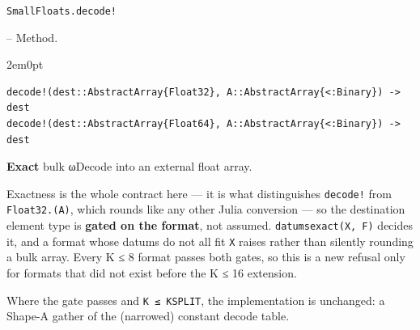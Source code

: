 \par\medskip\noindent\begin{minipage}{\linewidth}
\hypertarget{8861452329391555419}{\texttt{SmallFloats.decode!}}  -- {Method.}
\nopagebreak
\begin{adjustwidth}{2em}{0pt}


\begin{verbatim}
decode!(dest::AbstractArray{Float32}, A::AbstractArray{<:Binary}) -> dest
decode!(dest::AbstractArray{Float64}, A::AbstractArray{<:Binary}) -> dest
\end{verbatim}

\textbf{Exact} bulk ωDecode into an external float array.

Exactness is the whole contract here — it is what distinguishes \texttt{decode!} from \texttt{Float32.(A)}, which rounds like any other Julia conversion — so the destination element type is \textbf{gated on the format}, not assumed. \texttt{datumsexact(X, F)} decides it, and a format whose datums do not all fit \texttt{X} raises rather than silently rounding a bulk array. Every K ≤ 8 format passes both gates, so this is a new refusal only for formats that did not exist before the K ≤ 16 extension.

Where the gate passes and \texttt{K ≤ KSPLIT}, the implementation is unchanged: a Shape-A gather of the (narrowed) constant decode table.



\end{adjustwidth}
\end{minipage}
\par\medskip


